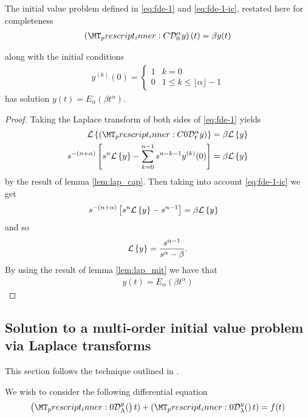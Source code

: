 \begin{lemma}
	The initial value problem defined in \eqref{eq:fde-1} and \eqref{eq:fde-1-ic}, restated here for completeness 
	\begin{align}
		\left( \prescript{C}{}{\mathcal{D}_0^\alpha}y \right)(t) = \beta y(t) 
	\end{align}

	along with the initial conditions 
	\begin{align}
		y^{(k)}(0) = 
		\begin{cases}
			1 & k = 0 \\
			0 & 1 \leq k \leq \lfloor \alpha \rfloor - 1  
		\end{cases}
	\end{align}
	has solution $ y(t) = E_\alpha \left( \beta t^\alpha \right) $.
\end{lemma}
\begin{proof}
	Taking the Laplace transform of both sides of \eqref{eq:fde-1} yields
	\begin{align}
		\laplace{\capder{0}{t}{\alpha}{y}} &= \beta \laplace{y} \\
		s^{-(n+\alpha)} \left[s^n \laplace{y} - \sum_{k=0}^{n-1} s^{n-k-1} y^{(k)}(0) \right] &= \beta \laplace{y}
	\end{align}
	by the result of lemma \ref{lem:lap_cap}. 
	Then taking into account \eqref{eq:fde-1-ic} we get
	\begin{align}
		s^{-(n+\alpha)} \left[s^n \mathcal{L} \left\{ y \right\} - s^{n-1}\right] &= \beta \mathcal{L} \left\{ y \right\}
	\end{align}
	and so 
	\begin{align}
		\mathcal{L} \left\{ y \right\} = \frac{s^{\alpha-1}}{s^\alpha - \beta}.
	\end{align}
	By using the result of lemma \ref{lem:lap_mit} we have that 
	\begin{align}
		y(t) = E_\alpha(\beta t^\alpha)
	\end{align}
\end{proof}

\subsection{Solution to a multi-order initial value problem via Laplace transforms}
This section follows the technique outlined in \cite{Podlubny1999}.

We wish to consider the following differential equation
\begin{align}
	\label{eq:fde-multi-order}
	\rld{0}{\Lambda}{y}(t) + \rld{0}{\lambda}{y}(t) = f(t)
\end{align}

